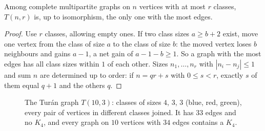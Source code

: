 \begin{lemma}\label{extremal:lem:balance}
Among complete multipartite graphs on $n$ vertices with at most $r$ classes, $T(n,r)$ is, up to isomorphism, the only one with the most edges.
\end{lemma}
\begin{proof}
Use $r$ classes, allowing empty ones. If two class sizes $a\ge b+2$ exist, move one vertex from the class of size $a$ to the class of size $b$:
the moved vertex loses $b$ neighbours and gains $a-1$, a net gain of $a-1-b\ge1$. So a graph with the most edges has all class sizes within $1$ of each other.
Sizes $n_1,\dots,n_r$ with $|n_i-n_j|\le1$ and sum $n$ are determined up to order: if $n=qr+s$ with $0\le s<r$, exactly $s$ of them equal $q+1$ and the others $q$.
\end{proof}

\begin{figure}[ht]
\centering
{}
\caption{The Tur\'an graph $T(10,3)$: classes of sizes $4$, $3$, $3$ (blue, red, green), every pair of vertices in different classes joined. It has $33$
edges and no $K_4$, and every graph on $10$ vertices with $34$ edges contains a $K_4$.}
\label{extremal:fig:turan}
\end{figure}

